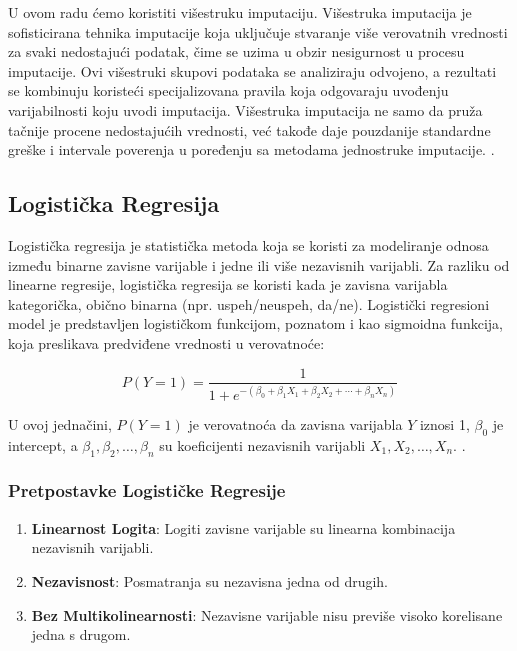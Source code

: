 \documentclass{article}
\begin{document}
U ovom radu ćemo koristiti višestruku imputaciju. Višestruka imputacija je sofisticirana tehnika imputacije koja uključuje stvaranje više verovatnih vrednosti za svaki nedostajući podatak, čime se uzima u obzir nesigurnost u procesu imputacije. Ovi višestruki skupovi podataka se analiziraju odvojeno, a rezultati se kombinuju koristeći specijalizovana pravila koja odgovaraju uvođenju varijabilnosti koju uvodi imputacija. Višestruka imputacija ne samo da pruža tačnije procene nedostajućih vrednosti, već takođe daje pouzdanije standardne greške i intervale poverenja u poređenju sa metodama jednostruke imputacije. \cite{little2019}.

\newpage

\subsection*{Logistička Regresija}

Logistička regresija je statistička metoda koja se koristi za modeliranje odnosa između binarne zavisne varijable i jedne ili više nezavisnih varijabli. Za razliku od linearne regresije, logistička regresija se koristi kada je zavisna varijabla kategorička, obično binarna (npr. uspeh/neuspeh, da/ne). Logistički regresioni model je predstavljen logističkom funkcijom, poznatom i kao sigmoidna funkcija, koja preslikava predviđene vrednosti u verovatnoće:

\[
P(Y=1) = \frac{1}{1 + e^{-(\beta_0 + \beta_1X_1 + \beta_2X_2 + \cdots + \beta_nX_n)}}
\]

U ovoj jednačini, \( P(Y=1) \) je verovatnoća da zavisna varijabla \( Y \) iznosi 1, \( \beta_0 \) je intercept, a \( \beta_1, \beta_2, \ldots, \beta_n \) su koeficijenti nezavisnih varijabli \( X_1, X_2, \ldots, X_n \). \cite{field2013}.

\subsubsection*{Pretpostavke Logističke Regresije}
\begin{enumerate}
    \item \textbf{Linearnost Logita}: Logiti zavisne varijable su linearna kombinacija nezavisnih varijabli.
    \item \textbf{Nezavisnost}: Posmatranja su nezavisna jedna od drugih.
    \item \textbf{Bez Multikolinearnosti}: Nezavisne varijable nisu previše visoko korelisane jedna s drugom.
\end{enumerate} 
\end{document}
